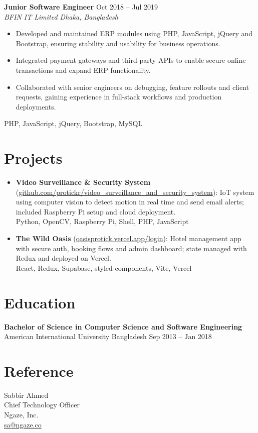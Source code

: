 \documentclass[a4paper,10pt]{article}
\begin{document}
\vspace{2pt}

\textbf{Junior Software Engineer} \hfill Oct 2018 -- Jul 2019\\[-2pt]
\textit{BFIN IT Limited \textbar{} Dhaka, Bangladesh}\\[-4pt]
\begin{itemize}
  \item Developed and maintained ERP modules using PHP, JavaScript, jQuery and Bootstrap, ensuring stability and usability for business operations.
  \item Integrated payment gateways and third-party APIs to enable secure online transactions and expand ERP functionality.
  \item Collaborated with senior engineers on debugging, feature rollouts and client requests, gaining experience in full-stack workflows and production deployments.
\end{itemize}
{\footnotesize\textsf{PHP, JavaScript, jQuery, Bootstrap, MySQL}}

\section*{Projects}
\begin{itemize}
  \item \textbf{Video Surveillance \& Security System} (\href{https://github.com/protickr/video_surveillance_and_security_system}{github.com/protickr/video\_surveillance\_and\_security\_system}): IoT system using computer vision to detect motion in real time and send email alerts; included Raspberry Pi setup and cloud deployment.\\
  {\footnotesize\textsf{Python, OpenCV, Raspberry Pi, Shell, PHP, JavaScript}}
  \vspace{2pt}
  \item \textbf{The Wild Oasis} (\href{https://oasisprotick.vercel.app/login}{oasisprotick.vercel.app/login}): Hotel management app with secure auth, booking flows and admin dashboard; state managed with Redux and deployed on Vercel.\\
  {\footnotesize\textsf{React, Redux, Supabase, styled-components, Vite, Vercel}}
\end{itemize}

\section*{Education}
\textbf{Bachelor of Science in Computer Science and Software Engineering}\\
American International University Bangladesh \hfill Sep 2013 -- Jan 2018

\vspace{2pt}

\section*{Reference}
Sabbir Ahmed \\
Chief Technology Officer \\
Ngaze, Inc. \\
\href{mailto:sa@ngaze.co}{sa@ngaze.co}
\end{document}
